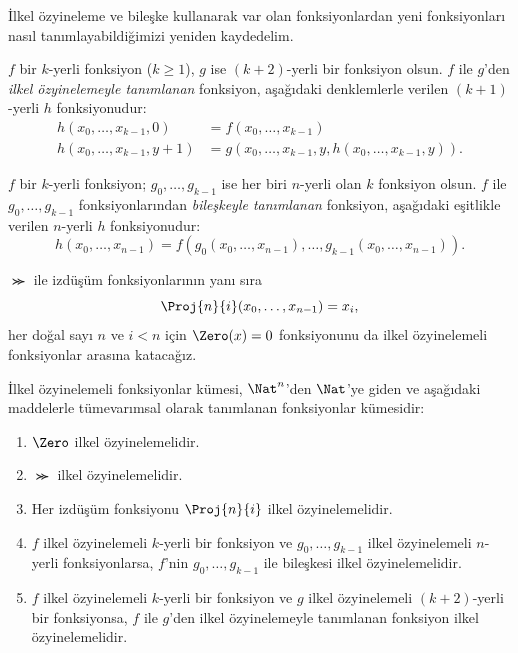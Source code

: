 


İlkel özyineleme ve bileşke kullanarak var olan fonksiyonlardan yeni
fonksiyonları nasıl tanımlayabildiğimizi yeniden kaydedelim.

\begin{defn}
  $f$ bir $k$-yerli fonksiyon ($k\geq1$), $g$ ise $(k+2)$-yerli bir
  fonksiyon olsun. $f$ ile $g$'den \emph{ilkel özyinelemeyle tanımlanan}
  fonksiyon, aşağıdaki denklemlerle verilen $(k+1)$-yerli $h$ fonksiyonudur:
  \begin{align*}
    h(x_0,\dots,x_{k-1},0) & = f(x_0,\dots,x_{k-1}) \\
    h(x_0,\dots,x_{k-1},y+1) & =
      g(x_0,\dots,x_{k-1},y,h(x_0,\dots,x_{k-1},y)).
  \end{align*}
\end{defn}

\begin{defn}
  $f$ bir $k$-yerli fonksiyon; $g_0,\dots,g_{k-1}$ ise her biri $n$-yerli
  olan $k$ fonksiyon olsun. $f$ ile $g_0,\dots,g_{k-1}$ fonksiyonlarından
  \emph{bileşkeyle tanımlanan} fonksiyon, aşağıdaki eşitlikle verilen
  $n$-yerli $h$ fonksiyonudur:
  \[
    h(x_0,\dots,x_{n-1})=
    f(g_0(x_0,\dots,x_{n-1}),\dots,g_{k-1}(x_0,\dots,x_{n-1})).
  \]
\end{defn}

$\Succ$ ile izdüşüm fonksiyonlarının yanı sıra
\[
  \Proj{n}{i}(x_0,\dots,x_{n-1})=x_i,
\]
her doğal sayı $n$ ve $i<n$ için $\Zero(x)=0$ fonksiyonunu da ilkel
özyinelemeli fonksiyonlar arasına katacağız.

\begin{defn}
  İlkel özyinelemeli fonksiyonlar kümesi, $\Nat^n$'den $\Nat$'ye giden ve
  aşağıdaki maddelerle tümevarımsal olarak tanımlanan fonksiyonlar kümesidir:
  \begin{enumerate}
  \item $\Zero$ ilkel özyinelemelidir.
  \item $\Succ$ ilkel özyinelemelidir.
  \item Her izdüşüm fonksiyonu $\Proj{n}{i}$ ilkel özyinelemelidir.
  \item $f$ ilkel özyinelemeli $k$-yerli bir fonksiyon ve
    $g_0,\dots,g_{k-1}$ ilkel özyinelemeli $n$-yerli fonksiyonlarsa,
    $f$'nin $g_0,\dots,g_{k-1}$ ile bileşkesi ilkel özyinelemelidir.
  \item $f$ ilkel özyinelemeli $k$-yerli bir fonksiyon ve $g$ ilkel
    özyinelemeli $(k+2)$-yerli bir fonksiyonsa, $f$ ile $g$'den ilkel
    özyinelemeyle tanımlanan fonksiyon ilkel özyinelemelidir.
  \end{enumerate}
\end{defn}

